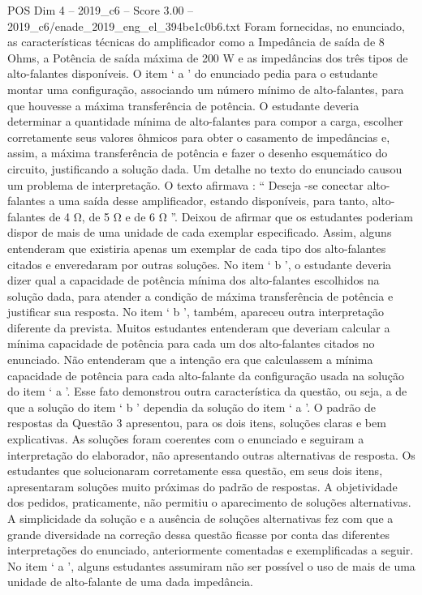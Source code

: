 \begin{textsample}{POS Dim 4 – 2019\_c6 – Score 3.00 – 2019\_c6/enade\_2019\_eng\_el\_394be1c0b6.txt}
Foram fornecidas, no enunciado, as características técnicas do amplificador como a Impedância de saída de 8 Ohms, a Potência de saída máxima de 200 W e as impedâncias dos três tipos de alto-falantes disponíveis.
O item ‘ a ’ do enunciado pedia para o estudante montar uma configuração, associando um número mínimo de alto-falantes, para que houvesse a máxima transferência de potência.
O estudante deveria determinar a quantidade mínima de alto-falantes para compor a carga, escolher corretamente seus valores ôhmicos para obter o casamento de impedâncias e, assim, a máxima transferência de potência e fazer o desenho esquemático do circuito, justificando a solução dada.
Um detalhe no texto do enunciado causou um problema de interpretação.
O texto afirmava : “ Deseja -se conectar alto-falantes a uma saída desse amplificador, estando disponíveis, para tanto, alto-falantes de 4 Ω, de 5 Ω e de 6 Ω ”.
Deixou de afirmar que os estudantes poderiam dispor de mais de uma unidade de cada exemplar especificado.
Assim, alguns entenderam que existiria apenas um exemplar de cada tipo dos alto-falantes citados e enveredaram por outras soluções.
No item ‘ b ’, o estudante deveria dizer qual a capacidade de potência mínima dos alto-falantes escolhidos na solução dada, para atender a condição de máxima transferência de potência e justificar sua resposta.
No item ‘ b ’, também, apareceu outra interpretação diferente da prevista.
Muitos estudantes entenderam que deveriam calcular a mínima capacidade de potência para cada um dos alto-falantes citados no enunciado.
Não entenderam que a intenção era que calculassem a mínima capacidade de potência para cada alto-falante da configuração usada na solução do item ‘ a ’.
Esse fato demonstrou outra característica da questão, ou seja, a de que a solução do item ‘ b ’ dependia da solução do item ‘ a ’.
O padrão de respostas da Questão 3 apresentou, para os dois itens, soluções claras e bem explicativas.
As soluções foram coerentes com o enunciado e seguiram a interpretação do elaborador, não apresentando outras alternativas de resposta.
Os estudantes que solucionaram corretamente essa questão, em seus dois itens, apresentaram soluções muito próximas do padrão de respostas.
A objetividade dos pedidos, praticamente, não permitiu o aparecimento de soluções alternativas.
A simplicidade da solução e a ausência de soluções alternativas fez com que a grande diversidade na correção dessa questão ficasse por conta das diferentes interpretações do enunciado, anteriormente comentadas e exemplificadas a seguir.
No item ‘ a ’, alguns estudantes assumiram não ser possível o uso de mais de uma unidade de alto-falante de uma dada impedância.

\end{textsample}
